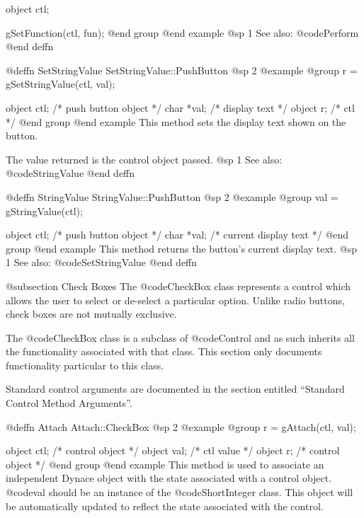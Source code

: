 {object  ctl;

gSetFunction(ctl, fun);
@end group
@end example
@sp 1
See also:  @code{Perform}
@end deffn



@deffn {SetStringValue} SetStringValue::PushButton
@sp 2
@example
@group
r = gSetStringValue(ctl, val);

object  ctl;    /*  push button object  */
char    *val;   /*  display text        */
object  r;      /*  ctl                 */
@end group
@end example
This method sets the display text shown on the button.

The value returned is the control object passed.
@sp 1
See also:  @code{StringValue}
@end deffn



@deffn {StringValue} StringValue::PushButton
@sp 2
@example
@group
val = gStringValue(ctl);

object  ctl;    /*  push button object   */
char    *val;   /*  current display text  */
@end group
@end example
This method returns the button's current display text.
@sp 1
See also:  @code{SetStringValue}
@end deffn















@subsection Check Boxes
The @code{CheckBox} class represents a control which allows the user
to select or de-select a particular option.  Unlike radio buttons,
check boxes are not mutually exclusive.

The @code{CheckBox} class is a subclass of @code{Control} and as such
inherits all the functionality associated with that class.  This section
only documents functionality particular to this class.

Standard control arguments are documented in the section entitled
``Standard Control Method Arguments''.








@deffn {Attach} Attach::CheckBox
@sp 2
@example
@group
r = gAttach(ctl, val);

object  ctl;   /*  control object  */
object  val;   /*  ctl value       */
object  r;     /*  control object  */
@end group
@end example
This method is used to associate an independent Dynace object with the
state associated with a control object.  @code{val} should be an
instance of the @code{ShortInteger} class.  This object will be
automatically updated to reflect the state associated with the control.

}
